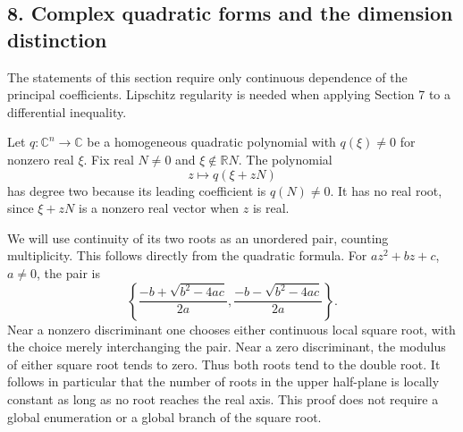 \documentclass[
  11pt,
]{article}
\makeatletter
\let\ReaderOriginalAnchorStart\hyper@anchorstart
\let\ReaderOriginalAnchorEnd\hyper@anchorend
\let\ReaderPendingAliases\@empty
\def\ReaderArmAliases#1{\gdef\ReaderPendingAliases{#1}}
\def\hyper@anchorstart#1{\ReaderIfNativeAnchorTF{#1}{\ReaderPendingAliases\global\let\ReaderPendingAliases\@empty}{}\ReaderOriginalAnchorStart{#1}}
\makeatother
\begin{document}
\ReaderArmAliases{\ReaderOriginalAnchorStart{AN03-SUC-008}\ReaderOriginalAnchorEnd\begingroup\expandafter\def\csname @currentHref\endcsname{AN03-SUC-008}\label{AN03-SUC-008}\endgroup\ReaderOriginalAnchorStart{an03-suc-008-complex-quadratic-forms-and-the-dimension-distinction}\ReaderOriginalAnchorEnd\begingroup\expandafter\def\csname @currentHref\endcsname{an03-suc-008-complex-quadratic-forms-and-the-dimension-distinction}\label{an03-suc-008-complex-quadratic-forms-and-the-dimension-distinction}\endgroup\ReaderOriginalAnchorStart{8-complex-quadratic-forms-and-the-dimension-distinction}\ReaderOriginalAnchorEnd\begingroup\expandafter\def\csname @currentHref\endcsname{8-complex-quadratic-forms-and-the-dimension-distinction}\label{8-complex-quadratic-forms-and-the-dimension-distinction}\endgroup\ReaderOriginalAnchorStart{complex-quadratic-forms-and-the-dimension-distinction}\ReaderOriginalAnchorEnd}
\subsection{8. Complex quadratic forms and the dimension
distinction}\label{complex-quadratic-forms-and-the-dimension-distinction}

The statements of this section require only continuous dependence of the
principal coefficients. Lipschitz regularity is needed when applying
Section 7 to a differential inequality.

Let \(q:\mathbb C^n\to\mathbb C\) be a homogeneous quadratic polynomial
with \(q(\xi)\ne0\) for nonzero real \(\xi\). Fix real \(N\ne0\) and
\(\xi\notin\mathbb RN\). The polynomial \[
                        z\longmapsto q(\xi+zN)                  \tag{S48}
\] has degree two because its leading coefficient is \(q(N)\ne0\). It
has no real root, since \(\xi+zN\) is a nonzero real vector when \(z\)
is real.

We will use continuity of its two roots as an unordered pair, counting
multiplicity. This follows directly from the quadratic formula. For
\(az^2+bz+c\), \(a\ne0\), the pair is \[
 \left\{\frac{-b+\sqrt{b^2-4ac}}{2a},
         \frac{-b-\sqrt{b^2-4ac}}{2a}\right\}.                    \tag{S49}
\] Near a nonzero discriminant one chooses either continuous local
square root, with the choice merely interchanging the pair. Near a zero
discriminant, the modulus of either square root tends to zero. Thus both
roots tend to the double root. It follows in particular that the number
of roots in the upper half-plane is locally constant as long as no root
reaches the real axis. This proof does not require a global enumeration
or a global branch of the square root.
\end{document}
